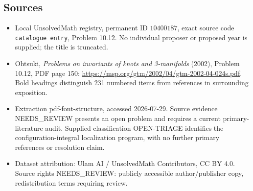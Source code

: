\documentclass[11pt]{article}
\begin{document}
\subsection{Sources}
\begin{itemize}
\item Local UnsolvedMath registry, permanent ID \(10400187\), exact source code \texttt{catalogue entry}, Problem 10.12. No individual proposer or proposed year is supplied; the title is truncated.
\item Ohtsuki, \emph{Problems on invariants of knots and 3-manifolds} (2002), Problem 10.12, PDF page 150: \url{https://msp.org/gtm/2002/04/gtm-2002-04-024s.pdf}. Bold headings distinguish 231 numbered items from references in surrounding exposition.
\item Extraction pdf-font-structure, accessed 2026-07-29. Source evidence NEEDS\_REVIEW presents an open problem and requires a current primary-literature audit. Supplied classification OPEN-TRIAGE identifies the configuration-integral localization program, with no further primary references or resolution claim.
\item Dataset attribution: Ulam AI / UnsolvedMath Contributors, CC BY 4.0. Source rights NEEDS\_REVIEW: publicly accessible author/publisher copy, redistribution terms requiring review.
\end{itemize}
\end{document}
